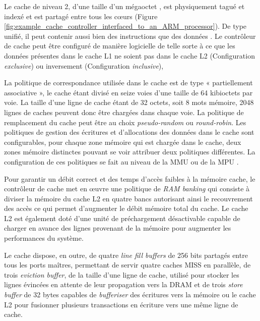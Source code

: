         Le cache de niveau 2, d'une taille d'un mégaoctet \cite{manuel:i_MX_6Dual_6Quad_applications_processor_reference_manual}, est physiquement tagué et indexé et est partagé entre tous les cœurs (Figure \ref{fig:example_cache_controller_interfaced_to_an_ARM_processor}).
        De type unifié, il peut contenir aussi bien des instructions que des données \cite{manuel:coreLink_level_2_cache_controller_L2C_310}.
        Le contrôleur de cache peut être configuré de manière logicielle de telle sorte à ce que les données présentes dans le cache L1 ne soient pas dans le cache L2 (Configuration \emph{exclusive}) ou inversement (Configuration \emph{inclusive}),

        La politique de correspondance utilisée dans le cache est de type « partiellement associative », le cache étant divisé en seize voies d'une taille de 64 kibioctets par voie. La taille d'une ligne de cache étant de 32 octets, soit 8 mots mémoire, 2048 lignes de caches peuvent donc être chargées dans chaque voie. La politique de remplacement du cache peut être au choix \emph{pseudo-random} ou \emph{round-robin}.
        Les politiques de gestion des écritures et d'allocations des données dans le cache sont configurables, pour chaque zone mémoire qui est chargée dans le cache, deux zones mémoire distinctes pouvant se voir attribuer deux politiques différentes. La configuration de ces politiques se fait au niveau de la MMU ou de la MPU \cite{manuel:cortex_a_series_programmer_s_guide}.

        Pour garantir un débit correct et des temps d'accès faibles à la mémoire cache, le contrôleur de cache met en œuvre une politique de \emph{RAM banking} qui consiste à diviser la mémoire du cache L2 en quatre bancs autorisant ainsi le recouvrement des accès ce qui permet d'augmenter le débit mémoire total du cache.%
        Le cache L2 est également doté d'une unité de préchargement désactivable capable de charger en avance des lignes provenant de la mémoire pour augmenter les performances du système.

        Le cache dispose, en outre, de quatre \emph{line fill buffers} de 256 bits partagés entre tous les ports maîtres, permettant de servir quatre caches MISS en parallèle, de trois \emph{eviction buffer}, de la taille d'une ligne de cache, utilisé pour stocker les lignes évincées en attente de leur propagation vers la DRAM et de trois \emph{store buffer} de 32 bytes capables de \emph{bufferiser} des écritures vers la mémoire ou le cache L2 pour fusionner plusieurs transactions en écriture vers une même ligne de cache.

